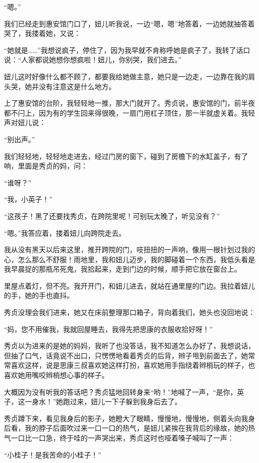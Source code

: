 \par “嗯。”
\par 我们已经走到惠安馆门口了，妞儿听我说，一边“嗯，嗯”地答着，一边她就抽答着哭了，我搂着她，又说：
\par “她就是……”我想说疯子，停住了，因为我早就不肯称呼她是疯子了，我转了话口说：“人家都说她想你想疯啦！妞儿，你别哭，我们进去。”
\par 妞儿这时好像什么都不顾了，都要我给她做主意，她只是一边走，一边靠在我的肩头哭，她并没有注意这是什么地方。
\par 上了惠安馆的台阶，我轻轻地一推，那大门就开了。秀贞说，惠安馆的门，前半夜都不闩上，因为有的学生回来得很晚，一扇门用杠子顶住，那一半就虚关着。我轻声对妞儿说：
\par “别出声。”
\par 我们轻轻地，轻轻地走进去，经过门房的窗下，碰到了房檐下的水缸盖子，有了响，里面是秀贞的妈，问：
\par “谁呀？”
\par “我，小英子！”
\par “这孩子！黑了还要找秀贞，在跨院里呢！可别玩太晚了，听见没有？”
\par “嗯。”我答应着，搂着妞儿向跨院走去。
\par 我从没有黑天以后来这里，推开跨院的门，吱扭扭的一声响，像用一根针划过我的心，怎么那么不舒服！雨地里，我和妞儿迈步，我的脚碰着一个东西，我低头看是我早晨捉的那瓶吊死鬼，我拾起来，走到门边的时候，顺手把它放在窗台上。
\par 里屋点着灯，但不亮。我开开门，和妞儿进去，就站在通里屋的门边。我拉着妞儿的手，她的手也直抖。
\par 秀贞没理会我们进来，她又在床前整理那口箱子，背向着我们，她头也没回地说：
\par “妈，您不用催我，我就回屋睡去，我得先把思康的衣服收拾好呀！”
\par 秀贞以为进来的是她的妈妈，我听了也没答话，我不知道怎么办好了，我想说话，但抽了口气，话竟说不出口，只愣愣地看着秀贞的后背，辫子甩到前面去了，她常常喜欢这样，说是思康三叔喜欢她这样打扮，喜欢她用手指绕着辫梢玩的样子，也喜欢她用嘴咬辫梢想心事的样子。
\par 大概因为没有听我的答话吧？秀贞猛地回转身来“哟！”地喊了一声，“是你，英子，这一身水！”她跑过来，妞儿一下子躲到我身后去了。
\par 秀贞蹲下来，看见我身后的影子，她瞪大了眼睛，慢慢地，慢慢地，侧着头向我身后看，我的脖子后面吹过来一口一口的热气，是妞儿紧挨在我背后的缘故，她的热气一口比一口急，终于哇的一声哭出来，秀贞这时也哑着嗓子喊叫了一声：
\par “小桂子！是我苦命的小桂子！”
